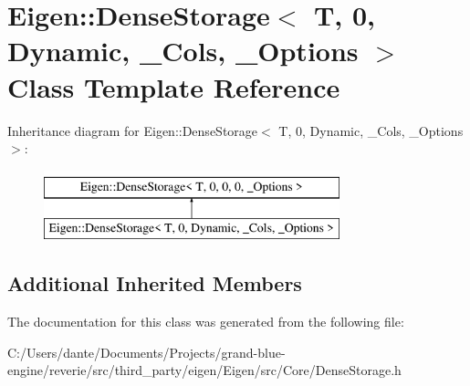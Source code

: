 \hypertarget{class_eigen_1_1_dense_storage_3_01_t_00_010_00_01_dynamic_00_01___cols_00_01___options_01_4}{}\section{Eigen\+::Dense\+Storage$<$ T, 0, Dynamic, \+\_\+\+Cols, \+\_\+\+Options $>$ Class Template Reference}
\label{class_eigen_1_1_dense_storage_3_01_t_00_010_00_01_dynamic_00_01___cols_00_01___options_01_4}
Inheritance diagram for Eigen\+::Dense\+Storage$<$ T, 0, Dynamic, \+\_\+\+Cols, \+\_\+\+Options $>$\+:\begin{figure}[H]
\begin{center}
\leavevmode
\includegraphics[height=2.000000cm]{class_eigen_1_1_dense_storage_3_01_t_00_010_00_01_dynamic_00_01___cols_00_01___options_01_4}
\end{center}
\end{figure}
\subsection*{Additional Inherited Members}


The documentation for this class was generated from the following file\+:\begin{DoxyCompactItemize}
\item 
C\+:/\+Users/dante/\+Documents/\+Projects/grand-\/blue-\/engine/reverie/src/third\+\_\+party/eigen/\+Eigen/src/\+Core/Dense\+Storage.\+h\end{DoxyCompactItemize}
